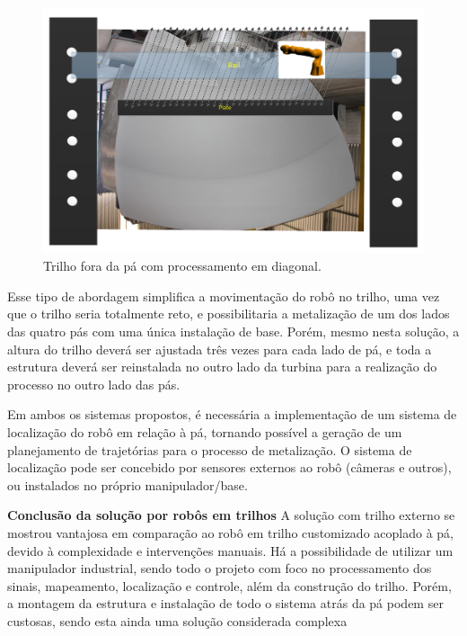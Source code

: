 \begin{figure}[h!]
\centering
	\includegraphics[width=\columnwidth]{figs/trilhos/rail2.pdf}
	\caption{Trilho fora da pá com processamento em diagonal.}
	\label{rail2}
\end{figure}

Esse tipo de abordagem simplifica a movimentação do robô no
trilho, uma vez que o trilho seria totalmente reto, e possibilitaria a
metalização de um dos lados das quatro pás com uma única instalação de base.
Porém, mesmo nesta solução, a altura do trilho deverá ser ajustada três vezes para
cada lado de pá, e toda a estrutura deverá ser reinstalada no outro lado da
turbina para a realização do processo no outro lado das pás.

Em ambos os sistemas propostos, é necessária a implementação de um sistema de
localização do robô em relação à pá, tornando possível a geração de um
planejamento de trajetórias para o processo de metalização. O sistema de
localização pode ser concebido por sensores externos
ao robô (câmeras e outros), ou instalados no próprio manipulador/base.

\textbf{Conclusão da solução por robôs em trilhos}
A solução com trilho externo se mostrou vantajosa em comparação ao robô em
trilho customizado acoplado à pá, devido à complexidade e intervenções
manuais. Há a possibilidade de utilizar um manipulador industrial, sendo
todo o projeto com foco no processamento dos sinais, mapeamento, localização e
controle, além da construção do trilho. Porém, a montagem da estrutura e
instalação de todo o sistema atrás da pá podem ser custosas, sendo esta ainda
uma solução considerada complexa
